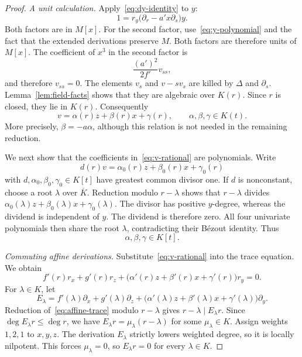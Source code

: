 \begin{proof}
\smallskip\noindent\emph{A unit calculation.}
Apply~\eqref{eq:dy-identity} to $y$:
\begin{equation}\label{eq:unit-identity}
 1=r_y\bigl(\partial_r-a'x\partial_s\bigr)y.
\end{equation}
Both factors are in $M[x]$. For the second factor, use~\eqref{eq:y-polynomial} and the fact that the extended derivations preserve $M$. Both factors are therefore units of $M[x]$. The coefficient of $x^3$ in the second factor is
\[
 \frac{(a')^2}{2f'}v_{ss},
\]
and therefore $v_{ss}=0$. The elements $v_s$ and $v-sv_s$ are killed by $\Delta$ and $\partial_s$. Lemma~\ref{lem:field-facts} shows that they are algebraic over $K(r)$. Since $r$ is closed, they lie in $K(r)$. Consequently
\begin{equation}\label{eq:v-rational}
 v=\alpha(r)z+\beta(r)x+\gamma(r),\qquad \alpha,\beta,\gamma\in K(t).
\end{equation}
More precisely, $\beta=-a\alpha$, although this relation is not needed in the remaining reduction.

We next show that the coefficients in~\eqref{eq:v-rational} are polynomials. Write
\[
 d(r)v=\alpha_0(r)z+\beta_0(r)x+\gamma_0(r)
\]
with $d,\alpha_0,\beta_0,\gamma_0\in K[t]$ have greatest common divisor one. If $d$ is nonconstant, choose a root $\lambda$ over $\overline K$. Reduction modulo $r-\lambda$ shows that $r-\lambda$ divides
$\alpha_0(\lambda)z+\beta_0(\lambda)x+\gamma_0(\lambda)$. The divisor has positive $y$-degree, whereas the dividend is independent of $y$. The dividend is therefore zero. All four univariate polynomials then share the root $\lambda$, contradicting their B\'ezout identity. Thus
\begin{equation}\label{eq:v-polynomial}
 \alpha,\beta,\gamma\in K[t].
\end{equation}

\smallskip\noindent\emph{Commuting affine derivations.}
Substitute~\eqref{eq:v-rational} into the trace equation. We obtain
\begin{equation}\label{eq:affine-trace}
 f'(r)r_x+g'(r)r_z+
 \bigl(\alpha'(r)z+\beta'(r)x+\gamma'(r)\bigr)r_y=0.
\end{equation}
For $\lambda\in K$, let
\[
 E_\lambda=f'(\lambda)\partial_x+g'(\lambda)\partial_z+
 \bigl(\alpha'(\lambda)z+\beta'(\lambda)x+\gamma'(\lambda)\bigr)\partial_y.
\]
Reduction of~\eqref{eq:affine-trace} modulo $r-\lambda$ gives $r-\lambda\mid E_\lambda r$. Since $\deg E_\lambda r\leq\deg r$, we have $E_\lambda r=\mu_\lambda(r-\lambda)$ for some $\mu_\lambda\in K$. Assign weights $1,2,1$ to $x,y,z$. The derivation $E_\lambda$ strictly lowers weighted degree, so it is locally nilpotent. This forces $\mu_\lambda=0$, so $E_\lambda r=0$ for every $\lambda\in K$.


\end{proof}

